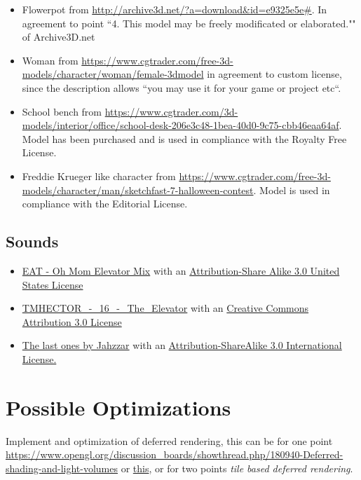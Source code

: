 \documentclass[12pt]{article}
\begin{document}
\begin{itemize}
\item Flowerpot from \url{http://archive3d.net/?a=download\&id=e9325e5e#}. In agreement to point ``4. This model may be freely modificated or elaborated."" of Archive3D.net

\item Woman from \url{https://www.cgtrader.com/free-3d-models/character/woman/female-3dmodel} in agreement to custom license, since the description allows ``you may use it for your game or project etc``. 

\item School bench from
\url{ https://www.cgtrader.com/3d-models/interior/office/school-desk-206e3c48-1bea-40d0-9c75-cbb46eaa64af}. Model has been purchased and is used in compliance with the Royalty Free License.

\item Freddie Krueger like character from 
\url{https://www.cgtrader.com/free-3d-models/character/man/sketchfast-7-halloween-contest}. Model is used in compliance with the Editorial License.

\end{itemize}

\subsection{Sounds}

\begin{itemize}
\item \href{http://freemusicarchive.org/music/EAT/20100129104001364/Oh_Mom_Elevator_Mix}{EAT - Oh Mom Elevator Mix} with an \href{http://creativecommons.org/licenses/by-sa/3.0/us/}{Attribution-Share Alike 3.0 United States License}
\item \href{http://freemusicarchive.org/music/TMHECTOR/The_Haunted_Mansion/DS10Forumcom\_-\_DS10Forumcom\_-\_The_Haunted_Mansion\_-\_16\_The\_Elevator}{TMHECTOR\_-\_16\_-\_The\_Elevator} with an \href{http://creativecommons.org/licenses/by/3.0/}{Creative Commons Attribution 3.0 License}

\item \href{http://freemusicarchive.org/music/Jahzzar/Smoke_Factory/The_last_ones}{The last ones by Jahzzar} with an \href{http://creativecommons.org/licenses/by-sa/3.0/}{Attribution-ShareAlike 3.0 International License.}

\end{itemize}

\section{Possible Optimizations}
Implement and optimization of deferred rendering, this can be for one point \href{deferred illumination}{https://www.opengl.org/discussion_boards/showthread.php/180940-Deferred-shading-and-light-volumes}
or \href{http://ogldev.atspace.co.uk/www/tutorial37/tutorial37.html}{this}, or for two points \textit{tile based deferred rendering}.



\end{document}
